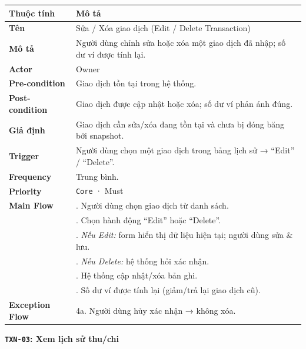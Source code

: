 \documentclass[11pt,a4paper]{article}
\newcounter{none}
\newcommand{\faintline}{%
  \noalign{\global\arrayrulecolor{faintgray}}%
  \hline
  \noalign{\global\arrayrulecolor{black}}%
} %
\begin{document}
{\def\LTcaptype{none}
\begin{longtable}[]{@{}
  >{\raggedright\arraybackslash}p{}
  >{\raggedright\arraybackslash}p{}@{}}
\toprule\noalign{}
\begin{minipage}[b]{\linewidth}\raggedright
Thuộc tính
\end{minipage} & \begin{minipage}[b]{\linewidth}\raggedright
Mô tả
\end{minipage} \\
\midrule\noalign{}
\endhead
\bottomrule\noalign{}
\endlastfoot
\textbf{Tên} & Sửa / Xóa giao dịch (Edit / Delete Transaction) \\ \faintline
\textbf{Mô tả} & Người dùng chỉnh sửa hoặc xóa một giao dịch đã nhập; số dư ví được tính lại. \\ \faintline
\textbf{Actor} & Owner \\ \faintline
\textbf{Pre-condition} & Giao dịch tồn tại trong hệ thống. \\ \faintline
\textbf{Post-condition} & Giao dịch được cập nhật hoặc xóa; số dư ví phản ánh đúng. \\ \faintline
\textbf{Giả định} & Giao dịch cần sửa/xóa đang tồn tại và chưa bị đóng băng bởi snapshot. \\ \faintline
\textbf{Trigger} & Người dùng chọn một giao dịch trong bảng lịch sử → ``Edit'' / ``Delete''. \\ \faintline
\textbf{Frequency} & Trung bình. \\ \faintline
\textbf{Priority} & \texttt{Core} · Must \\ \faintline
\textbf{Main Flow} & 1. Người dùng chọn giao dịch từ danh sách.\\ 
&2. Chọn hành động ``Edit'' hoặc ``Delete''.\\
&3. \emph{Nếu Edit:} form hiển thị dữ liệu hiện tại; người dùng sửa \& lưu.\\
&4. \emph{Nếu Delete:} hệ thống hỏi xác nhận. \\
&5. Hệ thống cập nhật/xóa bản ghi. \\
&6. Số dư ví được tính lại (giảm/trả lại giao dịch cũ). \\ \faintline
\textbf{Exception Flow} & 4a. Người dùng hủy xác nhận → không xóa. \\
\end{longtable}
}

\textbf{\texttt{TXN-03}: Xem lịch sử thu/chi}
\end{document}
